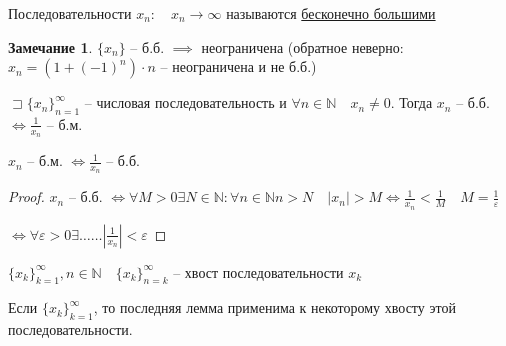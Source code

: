\documentclass{book}
\newcommand\N{\ensuremath{\mathbb{N}}}
\theoremstyle{definition}
\newtheorem*{note}{Замечание}
\begin{document}
    \begin{definition}
        Последовательности $x_n:\quad x_n\to \infty $ называются \underline{бесконечно большими}
    \end{definition}
    \begin{note}
        $\{x_n\}$ -- б.б. $\implies $ неограничена (обратное неверно: $x_{n}  = (1+(-1)^n)\cdot n$ -- неограничена и не б.б.)
    \end{note}
    \begin{lemma}

        $\sqsupset  \{x_n\}_{n=1}^{\infty }$ -- числовая последовательность и $\forall n\in \N  \quad x_n\neq 0$. Тогда $x_{n} $ -- б.б. $\iff \frac{1}{x_{n} }$ -- б.м. 

        $x_{n} $ -- б.м. $\iff  \frac{1}{x_{n} }$ -- б.б.
    \end{lemma}
    \begin{proof}
        $x_{n} $ -- б.б. $\iff  \forall M>0 \exists  N\in \N : \forall n\in \N  n>N\quad |x_n| >M \iff \frac{1}{x_{n} }<\frac{1}{M}\quad M = \frac{1}{\varepsilon}$

        $\iff \forall \varepsilon >0 \exists \ldots\ldots \left| \frac{1}{x_{n} } \right| <\varepsilon$
    \end{proof}

    $\{x_k\}_{k=1}^{\infty }, n\in \N \quad \{x_k\}_{n=k}^{\infty }$ -- хвост последовательности $x_k$

    Если $\{x_k\}_{k=1}^{\infty }$, то последняя лемма применима к некоторому хвосту этой последовательности. 
\end{document}
